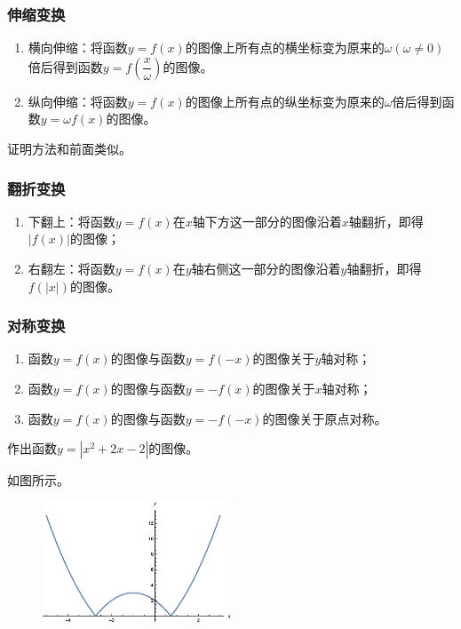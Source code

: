 \documentclass[lang=cn,math=cm,chinesefont=nofont,11pt,scheme=chinese,onecol]{elegantbook}
\begin{document}
\subsubsection{伸缩变换}

\begin{enumerate}
  \item 横向伸缩：将函数$y=f(x)$的图像上所有点的横坐标变为原来的$\omega(\omega\neq 0)$倍后得到函数$y=f(\dfrac{x}{\omega})$的图像。
  \item 纵向伸缩：将函数$y=f(x)$的图像上所有点的纵坐标变为原来的$\omega$倍后得到函数$y=\omega f(x)$的图像。
\end{enumerate}

证明方法和前面类似。

\subsubsection{翻折变换}

\begin{enumerate}
  \item 下翻上：将函数$y=f(x)$在$x$轴下方这一部分的图像沿着$x$轴翻折，即得$\left| f(x)\right|$的图像；
  \item 右翻左：将函数$y=f(x)$在$y$轴右侧这一部分的图像沿着$y$轴翻折，即得$f(\left| x\right|)$的图像。
\end{enumerate}

\subsubsection{对称变换}

\begin{enumerate}
  \item 函数$y=f(x)$的图像与函数$y=f(-x)$的图像关于$y$轴对称；
  \item 函数$y=f(x)$的图像与函数$y=-f(x)$的图像关于$x$轴对称；
  \item 函数$y=f(x)$的图像与函数$y=-f(-x)$的图像关于原点对称。
\end{enumerate}

\begin{example}
  作出函数$y=\left| x^2+2x-2\right|$的图像。
\end{example}

\begin{solution}
  如图所示。
\end{solution}

\begin{figure}[h]
  \centering
  \includegraphics[width=0.5\textwidth]{image/2.1.5function3.eps}
  \label{img:2.1.5function3}
\end{figure}
\end{document}
